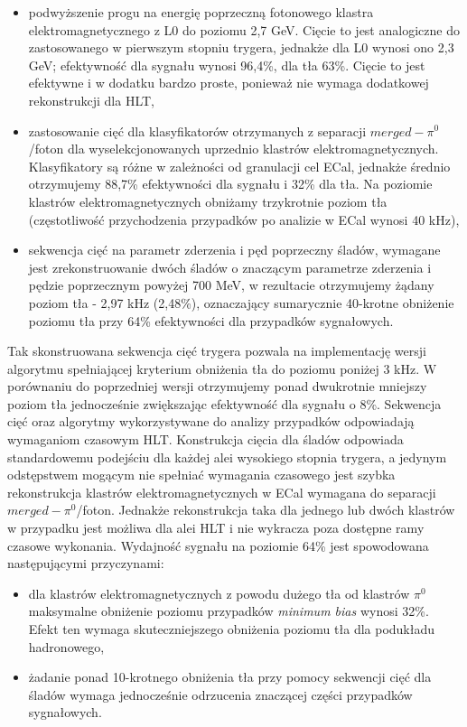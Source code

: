 \documentclass{pracamgr}
\begin{document}
\begin{itemize}
 \item podwyższenie progu na energię poprzeczną fotonowego klastra elektromagnetycznego z L0 do poziomu 2,7 GeV. Cięcie to jest analogiczne do zastosowanego w pierwszym stopniu trygera, jednakże dla L0 wynosi ono 2,3 GeV; efektywność dla sygnału wynosi 96,4\%, dla tła 63\%. Cięcie to jest efektywne i w dodatku bardzo proste, ponieważ nie wymaga dodatkowej rekonstrukcji dla HLT,
 \item zastosowanie cięć dla klasyfikatorów otrzymanych z separacji $merged-\pi^0$/foton dla wyselekcjonowanych uprzednio klastrów elektromagnetycznych. Klasyfikatory są różne w zależności od granulacji cel ECal, jednakże średnio otrzymujemy 88,7\% efektywności dla sygnału i 32\% dla tła. Na poziomie klastrów elektromagnetycznych obniżamy trzykrotnie poziom tła (częstotliwość przychodzenia przypadków po analizie w ECal wynosi 40 kHz), 
 \item sekwencja cięć na parametr zderzenia i pęd poprzeczny śladów, wymagane jest zrekonstruowanie dwóch śladów o znaczącym parametrze zderzenia i pędzie poprzecznym powyżej 700 MeV, w rezultacie otrzymujemy żądany poziom tła - 2,97 kHz (2,48\%), oznaczający sumarycznie 40-krotne obniżenie poziomu tła przy 64\% efektywności dla przypadków sygnałowych.
\end{itemize}
\noindent
Tak skonstruowana sekwencja cięć trygera pozwala na implementację wersji algorytmu spełniającej kryterium obniżenia tła do poziomu poniżej 3 kHz. W porównaniu do poprzedniej wersji otrzymujemy ponad dwukrotnie mniejszy poziom tła jednocześnie zwiększając efektywność dla sygnału o 8\%. Sekwencja cięć oraz algorytmy wykorzystywane do analizy przypadków odpowiadają wymaganiom czasowym HLT. Konstrukcja cięcia dla śladów odpowiada standardowemu podejściu dla każdej alei wysokiego stopnia trygera, a jedynym odstępstwem mogącym nie spełniać wymagania czasowego jest szybka rekonstrukcja klastrów elektromagnetycznych w ECal wymagana do separacji $merged-\pi^0$/foton. Jednakże rekonstrukcja taka dla jednego lub dwóch klastrów w przypadku jest możliwa dla alei HLT i nie wykracza poza dostępne ramy czasowe wykonania. Wydajność sygnału na poziomie 64\% jest spowodowana następującymi przyczynami:
\begin{itemize}
 \item dla klastrów elektromagnetycznych z powodu dużego tła od klastrów $\pi^0$ maksymalne obniżenie poziomu przypadków \textit{minimum bias} wynosi 32\%. Efekt ten wymaga skuteczniejszego obniżenia poziomu tła dla podukładu hadronowego,
 \item żadanie ponad 10-krotnego obniżenia tła przy pomocy sekwencji cięć dla śladów wymaga jednocześnie odrzucenia znaczącej części przypadków sygnałowych.
\end{itemize}
\end{document}
